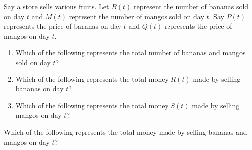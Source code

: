 \documentclass{ximera}
\author{Kenneth Berglund}
\begin{document}
\begin{exercise}
Say a store sells various fruits. Let $B(t)$ represent the number of bananas sold on day $t$ and $M(t)$ represent the number of mangos sold on day $t$. Say $P(t)$ represents the price of bananas on day $t$ and $Q(t)$ represents the price of mangos on day $t$.
\begin{enumerate}
\item Which of the following represents the total number of bananas and mangos sold on day $t$?
\begin{multipleChoice}
\end{multipleChoice}

\item Which of the following represents the total money $R(t)$ made by selling bananas on day $t$?
\begin{multipleChoice}
\end{multipleChoice}

\item Which of the following represents the total money $S(t)$ made by selling mangos on day $t$?
\begin{multipleChoice}
\end{multipleChoice}
\end{enumerate}

\item Which of the following represents the total money made by selling bananas and mangos on day $t$?
\begin{multipleChoice}
\end{multipleChoice}

\end{exercise}
\end{document}
